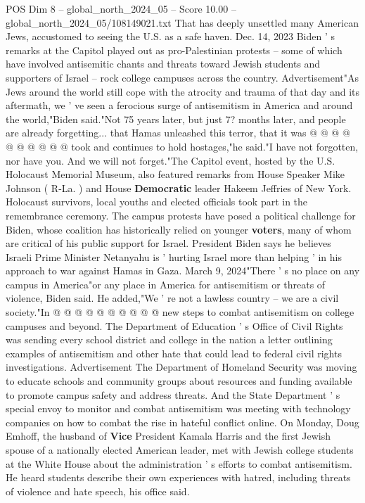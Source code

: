 \begin{textsample}{POS Dim 8 – global\_north\_2024\_05 – Score 10.00 – global\_north\_2024\_05/108149021.txt}
That has deeply unsettled many American Jews, accustomed to seeing the U.S. as a safe haven.
Dec. 14, 2023 Biden ' s remarks at the Capitol played out as pro-Palestinian protests -- some of which have involved antisemitic chants and threats toward Jewish students and supporters of Israel -- rock college campuses across the country.
Advertisement"As Jews around the world still cope with the atrocity and trauma of that day and its aftermath, we ' ve seen a ferocious surge of antisemitism in America and around the world,"Biden said."Not 75 years later, but just 7? months later, and people are already forgetting... that Hamas unleashed this terror, that it was @ @ @ @ @ @ @ @ @ @ took and continues to hold hostages,"he said."I have not forgotten, nor have you.
And we will not forget."The Capitol event, hosted by the U.S.
Holocaust Memorial Museum, also featured remarks from House Speaker Mike Johnson ( R-La. ) and House \textbf{Democratic} leader Hakeem Jeffries of New York.
Holocaust survivors, local youths and elected officials took part in the remembrance ceremony.
The campus protests have posed a political challenge for Biden, whose coalition has historically relied on younger \textbf{voters}, many of whom are critical of his public support for Israel.
President Biden says he believes Israeli Prime Minister Netanyahu is ' hurting Israel more than helping ' in his approach to war against Hamas in Gaza.
March 9, 2024"There ' s no place on any campus in America"or any place in America for antisemitism or threats of violence, Biden said.
He added,"We ' re not a lawless country -- we are a civil society."In @ @ @ @ @ @ @ @ @ @ new steps to combat antisemitism on college campuses and beyond.
The Department of Education ' s Office of Civil Rights was sending every school district and college in the nation a letter outlining examples of antisemitism and other hate that could lead to federal civil rights investigations.
Advertisement The Department of Homeland Security was moving to educate schools and community groups about resources and funding available to promote campus safety and address threats.
And the State Department ' s special envoy to monitor and combat antisemitism was meeting with technology companies on how to combat the rise in hateful conflict online.
On Monday, Doug Emhoff, the husband of \textbf{Vice} President Kamala Harris and the first Jewish spouse of a nationally elected American leader, met with Jewish college students at the White House about the administration ' s efforts to combat antisemitism.
He heard students describe their own experiences with hatred, including threats of violence and hate speech, his office said.

\end{textsample}
